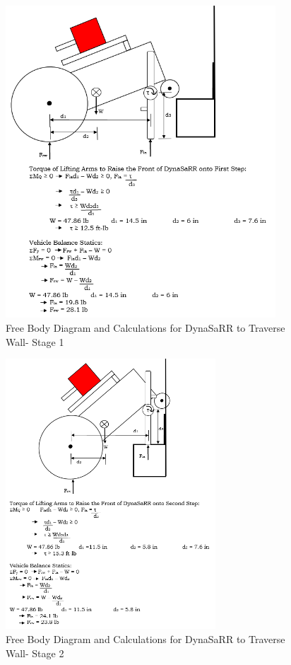 \label{fig:analysis3_wall1}
\begin{figure}[hp]
    \centering
    \includegraphics[width=0.9\textwidth]{Images/analysis3_wall1.png}
    \caption{Free Body Diagram and Calculations for DynaSaRR to Traverse Wall- Stage 1}
    \label{fig:analysis3_wall1}
\end{figure}
\vfill
\newpage

\label{fig:analysis4_wall2}
\begin{figure}[hp]
    \centering
    \includegraphics[width=0.7\textwidth]{Images/analysis4_wall2.png}
    \caption{Free Body Diagram and Calculations for DynaSaRR to Traverse Wall- Stage 2}
    \label{fig:analysis4_wall2}
\end{figure}
\vfill
\newpage

